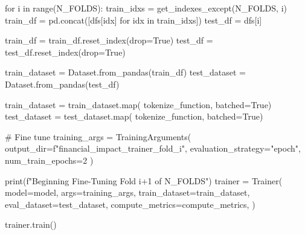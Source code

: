 \begin{python}
for i in range(N_FOLDS):
    train_idxs = get_indexes_except(N_FOLDS, i)
    train_df = pd.concat([dfs[idx] for idx in train_idxs])
    test_df = dfs[i]

    train_df = train_df.reset_index(drop=True)
    test_df = test_df.reset_index(drop=True)

    train_dataset = Dataset.from_pandas(train_df)
    test_dataset = Dataset.from_pandas(test_df)

    train_dataset = train_dataset.map(
        tokenize_function, batched=True)
    test_dataset = test_dataset.map(
        tokenize_function, batched=True)

    # Fine tune
    training_args = TrainingArguments(
        output_dir=f"financial_impact_trainer_fold_{i}",
        evaluation_strategy="epoch",
        num_train_epochs=2
    )

    print(f"Beginning Fine-Tuning Fold {i+1} of {N_FOLDS}")
    trainer = Trainer(
        model=model,
        args=training_args,
        train_dataset=train_dataset,
        eval_dataset=test_dataset,
        compute_metrics=compute_metrics,
    )

    trainer.train()

\end{python}
